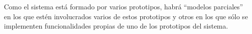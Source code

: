 Como el sistema está formado por varios prototipos, habrá ``modelos parciales''
en los que estén involucrados varios de estos prototipos y otros en los que
sólo se implementen funcionalidades propias de uno de los prototipos del
sistema.


%
%

